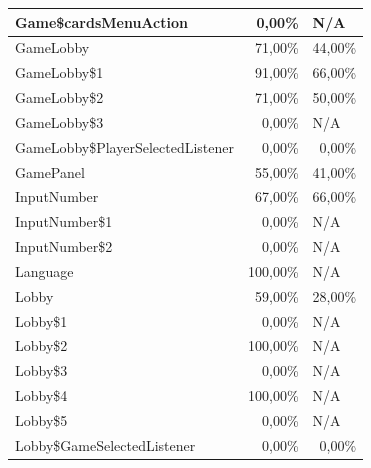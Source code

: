 \documentclass[a4paper]{article}
\begin{document}
\begin{tabular}{|l|r|l|}
Game\$cardsMenuAction & 0,00\% & N/A \\ \hline
GameLobby & 71,00\% & \multicolumn{1}{r|}{44,00\%} \\ \hline
GameLobby\$1 & 91,00\% & \multicolumn{1}{r|}{66,00\%} \\ \hline
GameLobby\$2 & 71,00\% & \multicolumn{1}{r|}{50,00\%} \\ \hline
GameLobby\$3 & 0,00\% & N/A \\ \hline
GameLobby\$PlayerSelectedListener & 0,00\% & \multicolumn{1}{r|}{0,00\%} \\ \hline
GamePanel & 55,00\% & \multicolumn{1}{r|}{41,00\%} \\ \hline
InputNumber & 67,00\% & \multicolumn{1}{r|}{66,00\%} \\ \hline
InputNumber\$1 & 0,00\% & N/A \\ \hline
InputNumber\$2 & 0,00\% & N/A \\ \hline
Language & 100,00\% & N/A \\ \hline
Lobby & 59,00\% & \multicolumn{1}{r|}{28,00\%} \\ \hline
Lobby\$1 & 0,00\% & N/A \\ \hline
Lobby\$2 & 100,00\% & N/A \\ \hline
Lobby\$3 & 0,00\% & N/A \\ \hline
Lobby\$4 & 100,00\% & N/A \\ \hline
Lobby\$5 & 0,00\% & N/A \\ \hline
Lobby\$GameSelectedListener & 0,00\% & \multicolumn{1}{r|}{0,00\%} \\ \hline
\end{tabular}
\end{document}
